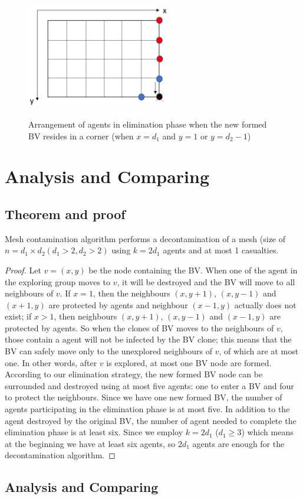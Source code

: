 \begin{itemize}
\begin{figure} [H]
{    \includegraphics[width=2.5in]{figures/meshcorner4.png}}
    \caption{Arrangement of agents in elimination phase when the new formed BV resides in a corner (when $x=d_1$ and $y=1$ or $y=d_2-1$)} 
  \label{fig:subfigmesh4} %
\end{figure}
\end{itemize}

\section{Analysis and Comparing}
\subsection{Theorem and proof}
\begin{theorem}
Mesh contamination algorithm performs a decontamination of a mesh (size of $n=d_1\times d_2(d_1>2,d_2>2)$ using $k=2d_1$ agents and at most 1 casualties.
\end{theorem}
\begin{proof}
Let $v=(x, y)$ be the node containing the BV. When one of the agent in the exploring group moves to $v$, it will be destroyed and the BV will move to all neighbours of $v$. If $x=1$, then the neighbours $(x, y+1)$, $(x, y-1)$ and $(x+1, y)$ are protected by agents and neighbour $(x-1, y)$ actually does not exist; if $x>1$, then neighbours $(x, y+1)$, $(x, y-1)$ and $(x-1, y)$ are protected by agents. So when the clones of BV moves to the neighbours of $v$, those contain a agent will not be infected by the BV clone; this means that the BV can safely move only to the unexplored neighbours of $v$, of which are at most one. In other words, after $v$ is explored, at most one BV node are formed. According to our elimination strategy, the new formed BV node can be surrounded and destroyed using at most five agents: one to enter a BV and four to protect the neighbours. Since we have one new formed BV, the number of agents participating in the elimination phase is at most five. In addition to the agent destroyed by the original BV, the number of agent needed to complete the elimination phase is at least six. Since we employ $k=2d_1$ ($d_1\geq 3$) which means at the beginning we have at least six agents, so $2d_1$ agents are enough for the decontamination algorithm.
\end{proof}

\subsection{Analysis and Comparing}









